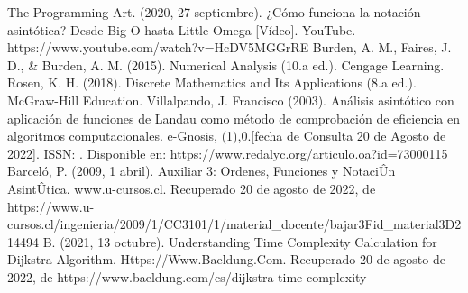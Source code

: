 \documentclass{article}
\begin{document}
\begin{thebibliography}{}
The Programming Art. (2020, 27 septiembre). ¿Cómo funciona la notación asintótica? Desde Big-O hasta Little-Omega [Vídeo]. YouTube. https://www.youtube.com/watch?v=HcDV5MGGrRE
Burden, A. M., Faires, J. D., \& Burden, A. M. (2015). Numerical Analysis (10.a ed.). Cengage Learning.
Rosen, K. H. (2018). Discrete Mathematics and Its Applications (8.a ed.). McGraw-Hill Education.
Villalpando, J. Francisco (2003). Análisis asintótico con aplicación de funciones de Landau como método de comprobación de eficiencia en algoritmos computacionales. e-Gnosis,  (1),0.[fecha de Consulta 20 de Agosto de 2022]. ISSN: . Disponible en:   https://www.redalyc.org/articulo.oa?id=73000115
Barceló, P. (2009, 1 abril). Auxiliar 3: Ordenes, Funciones y NotaciÛn AsintÛtica. www.u-cursos.cl. Recuperado 20 de agosto de 2022, de https://www.u-cursos.cl/ingenieria/2009/1/CC3101/1/material\_docente/bajar3Fid\_material3D214494
B. (2021, 13 octubre). Understanding Time Complexity Calculation for Dijkstra Algorithm. Https://Www.Baeldung.Com. Recuperado 20 de agosto de 2022, de https://www.baeldung.com/cs/dijkstra-time-complexity
\end{thebibliography}
\end{document}
